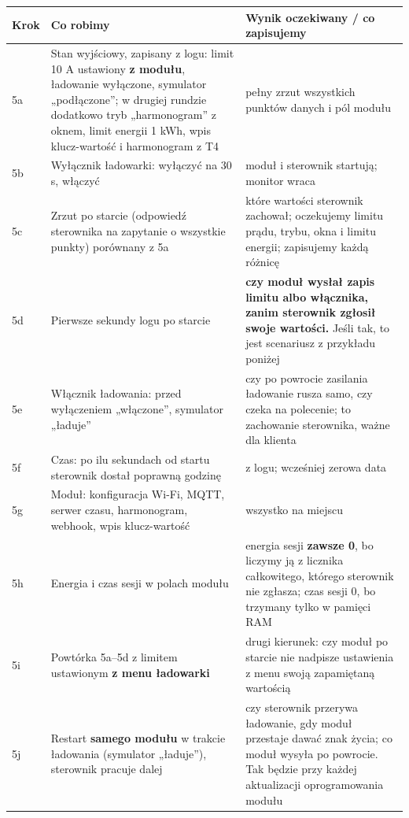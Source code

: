 \documentclass[11pt,a4paper]{article}
\begin{document}
\begin{longtable}{>{\raggedright\arraybackslash}p{3.00cm}>{\raggedright\arraybackslash}p{6.14cm}>{\raggedright\arraybackslash}p{6.14cm}}
\toprule
\rowcolor{apteallight}\textbf{Krok} & \textbf{Co robimy} & \textbf{Wynik oczekiwany / co zapisujemy} \\
\midrule\endhead
\bottomrule\endfoot
5a & Stan wyjściowy, zapisany z logu: limit 10 A ustawiony \textbf{z modułu}, ładowanie wyłączone, symulator „podłączone”; w drugiej rundzie dodatkowo tryb „harmonogram” z oknem, limit energii 1 kWh, wpis klucz-wartość i harmonogram z T4 & pełny zrzut wszystkich punktów danych i pól modułu \\
5b & Wyłącznik ładowarki: wyłączyć na 30 s, włączyć & moduł i sterownik startują; monitor wraca \\
5c & Zrzut po starcie (odpowiedź sterownika na zapytanie o wszystkie punkty) porównany z 5a & które wartości sterownik zachował; oczekujemy limitu prądu, trybu, okna i limitu energii; zapisujemy każdą różnicę \\
5d & Pierwsze sekundy logu po starcie & \textbf{czy moduł wysłał zapis limitu albo włącznika, zanim sterownik zgłosił swoje wartości.} Jeśli tak, to jest scenariusz z przykładu poniżej \\
5e & Włącznik ładowania: przed wyłączeniem „włączone”, symulator „ładuje” & czy po powrocie zasilania ładowanie rusza samo, czy czeka na polecenie; to zachowanie sterownika, ważne dla klienta \\
5f & Czas: po ilu sekundach od startu sterownik dostał poprawną godzinę & z logu; wcześniej zerowa data \\
5g & Moduł: konfiguracja Wi-Fi, MQTT, serwer czasu, harmonogram, webhook, wpis klucz-wartość & wszystko na miejscu \\
5h & Energia i czas sesji w polach modułu & energia sesji \textbf{zawsze 0}, bo liczymy ją z licznika całkowitego, którego sterownik nie zgłasza; czas sesji 0, bo trzymany tylko w pamięci RAM \\
5i & Powtórka 5a–5d z limitem ustawionym \textbf{z menu ładowarki} & drugi kierunek: czy moduł po starcie nie nadpisze ustawienia z menu swoją zapamiętaną wartością \\
5j & Restart \textbf{samego modułu} w trakcie ładowania (symulator „ładuje”), sterownik pracuje dalej & czy sterownik przerywa ładowanie, gdy moduł przestaje dawać znak życia; co moduł wysyła po powrocie. Tak będzie przy każdej aktualizacji oprogramowania modułu \\
\end{longtable}
\end{document}
